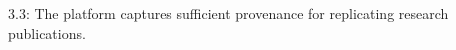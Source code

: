 3.3: The platform captures sufficient provenance for replicating research publications.


 
 


 
 


